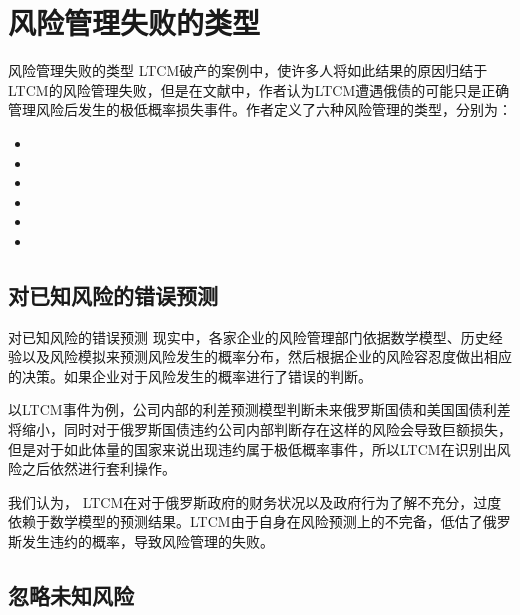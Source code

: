 \section{风险管理失败的类型}

\begin{frame}{风险管理失败的类型}
    LTCM破产的案例中，使许多人将如此结果的原因归结于LTCM的风险管理失败，但是在文献中，作者认为LTCM遭遇俄债的可能只是正确管理风险后发生的极低概率损失事件。作者定义了六种风险管理的类型，分别为：
    \begin{itemize}
        \item {}
        \item {}
        \item {}
        \item {}
        \item {}
        \item {}
    \end{itemize}
\end{frame}

\subsection{对已知风险的错误预测}\label{sec:1}

\begin{frame}{对已知风险的错误预测}
    现实中，各家企业的风险管理部门依据数学模型、历史经验以及风险模拟来预测风险发生的概率分布，然后根据企业的风险容忍度做出相应的决策。如果企业对于风险发生的概率进行了错误的判断。

    以LTCM事件为例，公司内部的利差预测模型判断未来俄罗斯国债和美国国债利差将缩小，同时对于俄罗斯国债违约公司内部判断存在这样的风险会导致巨额损失，但是对于如此体量的国家来说出现违约属于极低概率事件，所以LTCM在识别出风险之后依然进行套利操作。

    我们认为， LTCM在对于俄罗斯政府的财务状况以及政府行为了解不充分，过度依赖于数学模型的预测结果。LTCM由于自身在风险预测上的不完备，低估了俄罗斯发生违约的概率，导致风险管理的失败。
\end{frame}

\subsection{忽略未知风险}\label{sec:2}

